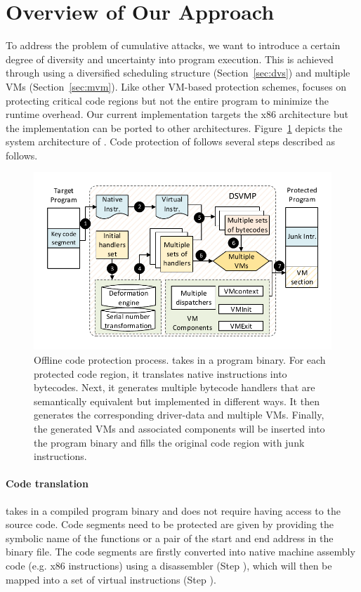 \section{Overview of Our Approach}\label{sec:overview}
To address the problem of cumulative attacks, we want to introduce a certain
degree of diversity and uncertainty into program execution. This is achieved
through using a diversified scheduling structure (Section~\ref {sec:dvs}) and
multiple VMs (Section~\ref {sec:mvm}). Like other VM-based protection schemes,
\DSVMP focuses on protecting critical code regions but not the entire program to minimize the runtime overhead.
Our current implementation targets the x86 architecture but the implementation can be
ported to other architectures. 
Figure~\ref{fig:Fig.overview} depicts the system architecture of \DSVMP.
Code protection of \DSVMP follows several steps described as follows.

\begin{figure}[!t]
  \centering
  \includegraphics[width=0.7\columnwidth]{figure/figoverview.pdf}
  \caption{Offline code protection process. \DSVMP takes in a program binary. For each protected code region, it translates native instructions into bytecodes. Next, it generates multiple bytecode handlers that are semantically equivalent but implemented in different ways. It then generates the corresponding driver-data and multiple VMs. Finally, the generated VMs and associated components will be inserted into the program binary and fills the original code region with junk instructions.}\label{fig:Fig.overview}
\end{figure}

\paragraph*{Code translation} \DSVMP takes in a compiled program binary and
does not require having access to the source code. Code segments need to be
protected are given by providing the symbolic name of the functions or a pair
of the start and end address in the binary file. The code segments are
firstly converted into native machine assembly code (e.g. x86 instructions)
using a disassembler (Step ), which will then be mapped into a set of virtual instructions (Step ).

